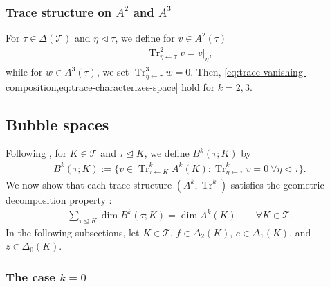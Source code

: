 \documentclass{mcom-l}
\theoremstyle{definition}
\theoremstyle{remark}
\numberwithin{equation}{section}
\DeclareMathOperator{\from}{\leftarrow}
\DeclareMathOperator{\Tr}{Tr}
\DeclareMathOperator{\subsimplex}{\unlhd}
\DeclareMathOperator{\strictsubsimplex}{\lhd}
\newcommand{\mesh}[0]{\mathcal{T}}
\begin{document}
\subsubsection{Trace structure on $A^2$ and $A^3$}

For $\tau \in \Delta(\mesh)$ and $\eta \strictsubsimplex \tau$, we define 
for ${v \in A^2(\tau)}$
\begin{align*}
	\Tr_{\eta \from \tau}^2 v = v|_{\eta},
\end{align*}
while for $w \in A^3(\tau)$, we set 
$\Tr_{\eta \from \tau}^3 w = 0$. Then, 
\cref{eq:trace-vanishing-composition,eq:trace-characterizes-space} hold
for $k = 2,3$.

\subsection{Bubble spaces}

Following \cite[Definition 2.3]{HuLiangLin25}, for $K \in \mesh$
and $\tau \subsimplex  K$, we define $B^k(\tau; K)$ by
\begin{align}
	\label{eq:generic-bubble-space}
	B^k(\tau; K) := \{ v \in \Tr^k_{\tau \from K} A^k(K) : 
	\Tr^k_{\eta \from \tau} v = 0 \ \forall \eta \strictsubsimplex \tau \}.
\end{align}
We now show that each trace structure $(A^k, \Tr^k)$ satisfies the 
geometric decomposition property \cite[Definition 2.4]{HuLiangLin25}:
\begin{align}
	\label{eq:geometric-decomposition}
	\sum_{\tau \subsimplex K} \dim B^k(\tau; K) = \dim A^k(K) 
	\qquad \forall K \in \mesh.
\end{align}
In the following subsections, let $K \in \mesh$, $f \in \Delta_2(K)$, 
$e \in \Delta_1(K)$, and $z \in \Delta_0(K)$.

\subsubsection{The case $k=0$}
\end{document}
